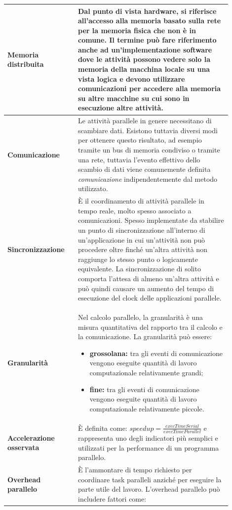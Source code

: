 \begin{longtable}{|m{0.28\linewidth}|m{0.62\linewidth}|}
		\\
		\hline
		\textbf{Memoria distribuita} & Dal punto di vista hardware, si riferisce all'accesso alla memoria basato sulla rete per la memoria fisica che non è in comune. Il termine può fare riferimento anche ad un'implementazione software dove le attività possono vedere solo la memoria della macchina locale su una vista logica e devono utilizzare comunicazioni per accedere alla memoria su altre macchine su cui sono in esecuzione altre attività.
		\\
		\hline
		\textbf{Comunicazione} & Le attività parallele in genere necessitano di scambiare dati. Esistono tuttavia diversi modi per ottenere questo risultato, ad esempio tramite un bus di memoria condiviso o tramite una rete, tuttavia l'evento effettivo dello scambio di dati viene comunemente definita \emph{comunicazione} indipendentemente dal metodo utilizzato.
		\\
		\hline
		\textbf{Sincronizzazione} & È il coordinamento di attività parallele in tempo reale, molto spesso associato a comunicazioni. Spesso implementate da stabilire un punto di sincronizzazione all'interno di un'applicazione in cui un'attività non può procedere oltre finché un'altra attività non raggiunge lo stesso punto o logicamente equivalente. La sincronizzazione di solito comporta l'attesa di almeno un'altra attività e può quindi causare un aumento del tempo di esecuzione del clock delle applicazioni parallele.
		\\
		\hline
		\textbf{Granularità} & Nel calcolo parallelo, la granularità è una misura quantitativa del rapporto tra il calcolo e la comunicazione. La granularità può essere:
		\begin{itemize}
			\item \textbf{grossolana:} tra gli eventi di comunicazione vengono eseguite quantità di lavoro computazionale relativamente grandi;
			\item \textbf{fine:} tra gli eventi di comunicazione vengono eseguite quantità di lavoro computazionale relativamente piccole.
		\end{itemize}
		\\
		\hline
		\textbf{Accelerazione osservata} & È definita come: $speedup = \frac{execTimeSerial}{execTimeParallel}$ e rappresenta uno degli indicatori più semplici e utilizzati per la performance di un programma parallelo.
		\\
		\hline
		\textbf{Overhead parallelo} & È l'ammontare di tempo richiesto per coordinare task paralleli anziché per eseguire la parte utile del lavoro. L'overhead parallelo può includere fattori come:

\end{longtable}
